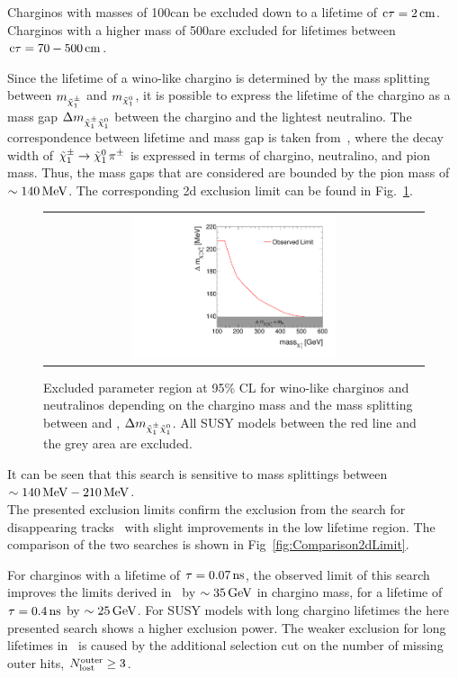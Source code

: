 Charginos with masses of 100\gev can be excluded down to a lifetime of $\text{c}\tau=2\,\text{cm}$.
Charginos with a higher mass of 500\gev are excluded for lifetimes between $\text{c}\tau=70-500\,\text{cm}$.

Since the lifetime of a wino-like chargino is determined by the mass splitting between $m_{\tilde{\chi}^{\pm}_{1}}$ and $m_{\tilde{\chi}^{0}_{1}}$, 
it is possible to express the lifetime of the chargino as a mass gap $\Delta m_{\tilde{\chi}^{\pm}_{1}\tilde{\chi}^{0}_{1}}$ between the chargino and the lightest neutralino.
The correspondence between lifetime and mass gap is taken from~\cite{bib:MassSplitting_Drees}, where the decay width of $\tilde{\chi}^{\pm}_{1} \rightarrow \tilde{\chi}^{0}_{1}\, \pi^{\pm}$ is expressed in terms of chargino, neutralino, and pion mass.
Thus, the mass gaps that are considered are bounded by the pion mass of $\sim140\,\text{Me}\kern-0.06667em\text{V}$.
The corresponding 2d exclusion limit can be found in Fig.~\ref{fig:DeltaMLimit2d}.
\begin{figure}[!t]
  \centering 
  \begin{tabular}{c}
    \includegraphics[width=0.55\textwidth]{figures/analysis/Interpretation/MassSplittingLimitPlot.pdf} 
  \end{tabular}
  \caption{Excluded parameter region at 95\% CL for wino-like charginos and neutralinos depending on the chargino mass and the mass splitting between \chipm and \chiO, $\Delta m_{\tilde{\chi}^{\pm}_{1}\tilde{\chi}^{0}_{1}}$.
          All SUSY models between the red line and the grey area are excluded.}
  \label{fig:DeltaMLimit2d}
\end{figure} 
It can be seen that this search is sensitive to mass splittings between $\sim 140\,\text{Me}\kern-0.06667em\text{V}-210\,\text{Me}\kern-0.06667em\text{V}$.\\

The presented exclusion limits confirm the exclusion from the search for disappearing tracks~\cite{bib:CMS:DT_8TeV} with slight improvements in the low lifetime region.
The comparison of the two searches is shown in Fig~\ref{fig:Comparison2dLimit}.

For charginos with a lifetime of $\tau=0.07\,\text{ns}$, the observed limit of this search improves the limits derived in~\cite{bib:CMS:DT_8TeV} by $\sim35\,\text{Ge}\kern-0.06667em\text{V}$ in chargino mass, for a lifetime of $\tau=0.4\,\text{ns}$ by $\sim25\,\text{Ge}\kern-0.06667em\text{V}$. 
For SUSY models with long chargino lifetimes the here presented search shows a higher exclusion power.
The weaker exclusion for long lifetimes in~\cite{bib:CMS:DT_8TeV} is caused by the additional selection cut on the number of missing outer hits, $N_{\text{lost}}^{\text{outer}}\geq3$.

